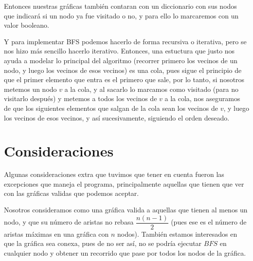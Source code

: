 Entonces nuestras gráficas también contaran con un diccionario con sus nodos que indicará si un nodo ya fue visitado o no, y para ello lo marcaremos con un valor booleano. 

Y para implementar BFS podemos hacerlo de forma recursiva o iterativa, pero se nos hizo más sencillo hacerlo iterativo. 
Entonces, una estuctura que justo nos ayuda a modelar lo principal del algoritmo (recorrer primero los vecinos de un nodo, y luego los vecinos de esos vecinos) es una cola, pues sigue el principio de que el primer elemento que entra es el primero que sale, por lo tanto, si nosotros metemos un nodo \(v\) a la cola, y al sacarlo lo marcamos como visitado (para no visitarlo después) y metemos a todos los vecinos de \(v\) a la cola, nos aseguramos de que los siguientes elementos que salgan de la cola sean los vecinos de \(v\), y luego los vecinos de esos vecinos, y así sucesivamente, siguiendo el orden deseado.


\section*{Consideraciones}
Algunas consideraciones extra que tuvimos que tener en cuenta fueron las excepciones que maneja el programa, principalmente aquellas que tienen que ver con las gráficas validas que podemos aceptar.

Nosotros consideramos como una gráfica valida a aquellas que tienen al menos un nodo, y que su número de aristas no rebasa \(\dfrac{n(n-1)}{2}\) (pues ese es el número de aristas máximas en una gráfica con \(n\) nodos). También estamos interesados en que la gráfica sea conexa, pues de no ser así, no se podría ejecutar \(BFS\) en cualquier nodo y obtener un recorrido que pase por todos los nodos de la gráfica. 
